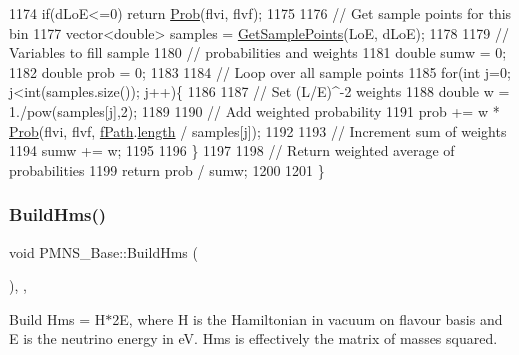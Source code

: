 \begin{DoxyCode}
1174   \textcolor{keywordflow}{if}(dLoE<=0) \textcolor{keywordflow}{return} \hyperlink{classOscProb_1_1PMNS__Base_aec5c399b93261f1962a4b7dbbb44b973}{Prob}(flvi, flvf);
1175 
1176   \textcolor{comment}{// Get sample points for this bin}
1177   vector<double> samples = \hyperlink{classOscProb_1_1PMNS__Base_a9eac8d768c1424755ee41f7e783af179}{GetSamplePoints}(LoE, dLoE);
1178 
1179   \textcolor{comment}{// Variables to fill sample}
1180   \textcolor{comment}{// probabilities and weights}
1181   \textcolor{keywordtype}{double} sumw = 0;
1182   \textcolor{keywordtype}{double} prob = 0;
1183 
1184   \textcolor{comment}{// Loop over all sample points}
1185   \textcolor{keywordflow}{for}(\textcolor{keywordtype}{int} j=0; j<int(samples.size()); j++)\{
1186 
1187     \textcolor{comment}{// Set (L/E)^-2 weights}
1188     \textcolor{keywordtype}{double} w = 1./pow(samples[j],2);
1189 
1190     \textcolor{comment}{// Add weighted probability}
1191     prob += w * \hyperlink{classOscProb_1_1PMNS__Base_aec5c399b93261f1962a4b7dbbb44b973}{Prob}(flvi, flvf, \hyperlink{classOscProb_1_1PMNS__Base_a849437aa8891fe042e86886ce8f81c6e}{fPath}.\hyperlink{structOscProb_1_1NuPath_af22660894b6e25cf835500381b155557}{length} / samples[j]);
1192 
1193     \textcolor{comment}{// Increment sum of weights}
1194     sumw += w;
1195 
1196   \}
1197 
1198   \textcolor{comment}{// Return weighted average of probabilities}
1199   \textcolor{keywordflow}{return} prob / sumw;
1200 
1201 \}
\end{DoxyCode}
\mbox{\label{classOscProb_1_1PMNS__Base_ad0faf5eae755afb1baa1fcd5ffebad41}} 
\subsubsection{\texorpdfstring{Build\+Hms()}{BuildHms()}}
{\footnotesize\ttfamily void P\+M\+N\+S\+\_\+\+Base\+::\+Build\+Hms (\begin{DoxyParamCaption}{ }\end{DoxyParamCaption})\hspace{0.3cm}{\ttfamily [protected]}, {\ttfamily [virtual]}, {\ttfamily [inherited]}}

Build Hms = H$\ast$2E, where H is the Hamiltonian in vacuum on flavour basis and E is the neutrino energy in eV. Hms is effectively the matrix of masses squared.

